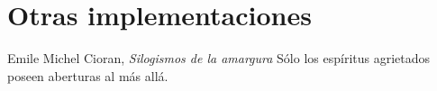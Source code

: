 \chapter{Otras implementaciones}

\begin{chapquote}{Emile Michel Cioran, \textit{Silogismos de la amargura}}
Sólo los espíritus agrietados poseen aberturas al más allá.
\end{chapquote}

\lipsum[1-2]